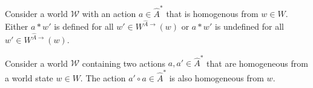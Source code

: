 \begin{corollaryE}
\label{col:homogeneous_action_in_defined_or_undefined}
    Consider a world $\mathscr{W}$ with an action $a \in \hat{A}^{*}$ that is homogenous from $w \in W$.
    Either $a \ast w'$ is defined for all $w' \in W^{\hat{A}\to}(w)$ or $a \ast w'$ is undefined for all $w' \in W^{\hat{A}\to}(w)$.
\end{corollaryE}
\begin{proofE}
\end{proofE}


\begin{propositionE}
    Consider a world $\mathscr{W}$ containing two actions $a, a' \in \hat{A}^{*}$ that are homogeneous from a world state $w \in W$.
    The action $a' \circ a \in \hat{A}^{*}$ is also homogeneous from $w$.
\end{propositionE}
